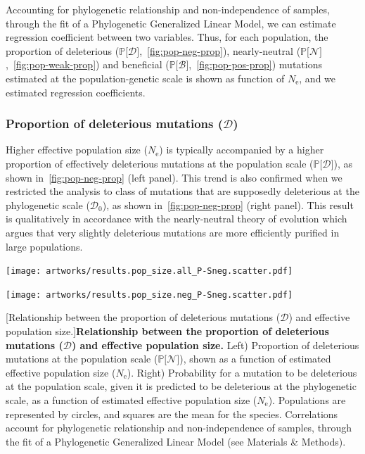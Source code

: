 \documentclass{article}
\newcommand{\Ne}{N_{\text{e}}}
\newcommand{\proba}{\mathbb{P}}
\newcommand{\SphyDel}{\mathcal{D}_0}
\newcommand{\SpopDel}{\mathcal{D}}
\newcommand{\SpopNeu}{\mathcal{N}}
\newcommand{\SpopBen}{\mathcal{B}}
\newcommand{\ProbaPopDel}{\proba{[} \SpopDel]}
\newcommand{\ProbaPopNeu}{\proba{[} \SpopNeu ]}
\newcommand{\ProbaPopBen}{\proba{[} \SpopBen ]}
\begin{document}
    \newpage
    Accounting for phylogenetic relationship and non-independence of samples, through the fit of a Phylogenetic Generalized Linear Model, we can estimate regression coefficient between two variables.
    Thus, for each population, the proportion of deleterious ($\ProbaPopDel$,~\ref{fig:pop-neg-prop}), nearly-neutral ($\ProbaPopNeu$,~\ref{fig:pop-weak-prop}) and beneficial ($\ProbaPopBen$,~\ref{fig:pop-pos-prop}) mutations estimated at the population-genetic scale is shown as function of $\Ne$, and we estimated regression coefficients.


    \subsubsection{Proportion of deleterious mutations (\texorpdfstring{$\SpopDel$}{D})}\label{subsec:proportion-deleterious-mutations}

    Higher effective population size ($\Ne$) is typically accompanied by a higher proportion of effectively deleterious mutations at the population scale ($\proba{[} \SpopDel {]}$), as shown in~\ref{fig:pop-neg-prop} (left panel).
    This trend is also confirmed when we restricted the analysis to class of mutations that are supposedly deleterious at the phylogenetic scale ($\SphyDel$), as shown in~\ref{fig:pop-neg-prop} (right panel).
    This result is qualitatively in accordance with the nearly-neutral theory of evolution which argues that very slightly deleterious mutations are more efficiently purified in large populations.

    \begin{center}
    \begin{minipage}{0.49\linewidth}
        \texttt{[image: artworks/results.pop\_size.all\_P-Sneg.scatter.pdf]}
    \end{minipage}
    \begin{minipage}{0.49\linewidth}
        \texttt{[image: artworks/results.pop\_size.neg\_P-Sneg.scatter.pdf]}
    \end{minipage}
    [Relationship between the proportion of deleterious mutations ($\SpopDel$) and effective population size.]{\textbf{Relationship between the proportion of deleterious mutations ($\bm{\SpopDel}$) and effective population size.}
    Left) Proportion of deleterious mutations at the population scale ($\proba{[} \SpopNeu{]}$), shown as a function of estimated effective population size ($\Ne$). Right) Probability for a mutation to be deleterious at the population scale, given it is predicted to be deleterious at the phylogenetic scale, as a function of estimated effective population size ($\Ne$). Populations are represented by circles, and squares are the mean for the species. Correlations account for phylogenetic relationship and non-independence of samples, through the fit of a Phylogenetic Generalized Linear Model (see Materials \& Methods).\label{fig:pop-neg-prop}}
    \end{center}
\end{document}
